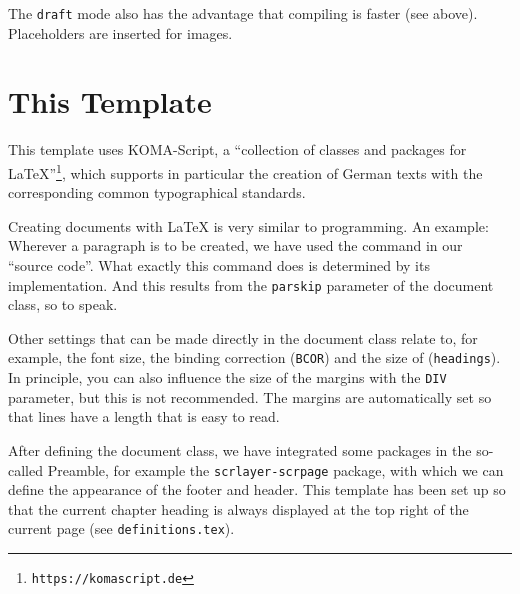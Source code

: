 The \texttt{draft} mode also has the advantage that compiling is faster (see 
above). Placeholders are inserted for images.

\section{This Template}
\label{sec:template}
This template uses KOMA-Script, a \enquote{collection 
of classes and packages for \LaTeX}\footnote{\texttt{https://komascript.de}}, 
which supports in particular the creation of German texts with the corresponding 
common typographical standards.

Creating documents with \LaTeX{} is very similar to programming. An example: 
Wherever a paragraph is to be created, we have used the  command in 
our \enquote{source code}. What exactly this command does is determined by its 
implementation. And this results from the \texttt{parskip} parameter of the 
document class, so to speak.

Other settings that can be made directly in the document class relate to, for 
example, the font size, the binding correction (\texttt{BCOR}) and the size of 
(\texttt{headings}). In principle, you can also influence the size of the 
margins with the \texttt{DIV} parameter, but this is not recommended. The 
margins are automatically set so that lines have a length that is easy to read.


After defining the document class, we have integrated some packages in the 
so-called Preamble, for example the \texttt{scrlayer-scrpage} package, with 
which we can define the appearance of the footer and header. This template has 
been set up so that the current chapter heading is always displayed at the top 
right of the current page (see \texttt{definitions.tex}).

